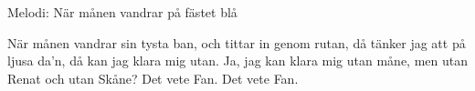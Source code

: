 \begin{song}

\begin{songmeta}
Melodi: När månen vandrar på fästet blå
\end{songmeta}

\begin{songtext}
När månen vandrar sin tysta ban,
och tittar in genom rutan,
då tänker jag att på ljusa da'n,
då kan jag klara mig utan.
Ja, jag kan klara mig utan måne,
men utan Renat och utan Skåne?
Det vete Fan. Det vete Fan.
\end{songtext}
\end{song}
